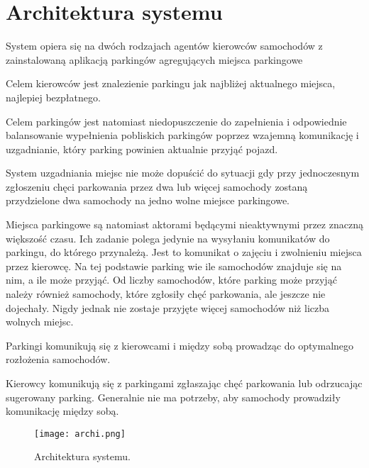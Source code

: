 \newpage
\section{Architektura systemu}

System opiera się na dwóch rodzajach agentów
kierowców samochodów z zainstalowaną aplikacją
parkingów agregujących miejsca parkingowe

Celem kierowców jest znalezienie parkingu jak najbliżej aktualnego miejsca, najlepiej bezpłatnego.

Celem parkingów jest natomiast niedopuszczenie do zapełnienia i odpowiednie balansowanie wypełnienia pobliskich parkingów poprzez wzajemną komunikację i uzgadnianie, który parking powinien aktualnie przyjąć pojazd.

System uzgadniania miejsc nie może dopuścić do sytuacji gdy przy jednoczesnym zgłoszeniu chęci parkowania przez dwa lub więcej samochody zostaną przydzielone dwa samochody na jedno wolne miejsce parkingowe.

Miejsca parkingowe są natomiast aktorami będącymi nieaktywnymi przez znaczną większość czasu. Ich zadanie polega jedynie na wysyłaniu komunikatów do parkingu, do którego przynależą. Jest to komunikat o zajęciu i zwolnieniu miejsca przez kierowcę. Na tej podstawie parking wie ile samochodów znajduje się na nim, a ile może przyjąć. Od liczby samochodów, które parking może przyjąć należy również samochody, które zgłosiły chęć parkowania, ale jeszcze nie dojechały. Nigdy jednak nie zostaje przyjęte więcej samochodów niż liczba wolnych miejsc.

Parkingi komunikują się z kierowcami i między sobą prowadząc do optymalnego rozłożenia samochodów.

Kierowcy komunikują się z parkingami zgłaszając chęć parkowania lub odrzucając sugerowany parking. Generalnie nie ma potrzeby, aby samochody prowadziły komunikację między sobą.

\begin{figure}[H]
    \label{fig:architektura}
    \centering \texttt{[image: archi.png]}
    \caption{Architektura systemu.}
\end{figure}